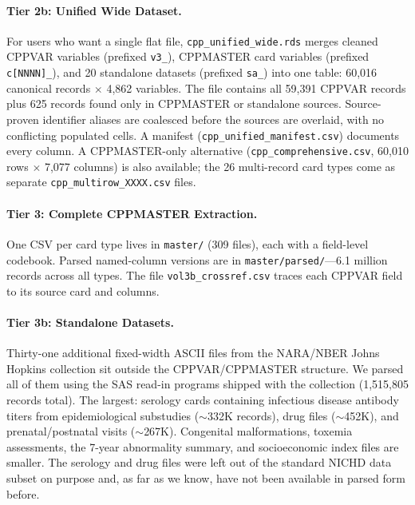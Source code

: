 \documentclass[12pt]{article}
\begin{document}
\paragraph{Tier 2b: Unified Wide Dataset.}
For users who want a single flat file, \texttt{cpp\_unified\_\allowbreak wide.rds} merges cleaned CPPVAR variables (prefixed \texttt{v3\_}), CPPMASTER card variables (prefixed \texttt{c[NNNN]\_}), and 20 standalone datasets (prefixed \texttt{sa\_}) into one table: 60,016 canonical records $\times$ 4,862 variables. The file contains all 59,391 CPPVAR records plus 625 records found only in CPPMASTER or standalone sources. Source-proven identifier aliases are coalesced before the sources are overlaid, with no conflicting populated cells. A manifest (\texttt{cpp\_unified\_manifest.csv}) documents every column. A CPPMASTER-only alternative (\texttt{cpp\_comprehensive.csv}, 60,010 rows $\times$ 7,077 columns) is also available; the 26 multi-record card types come as separate \texttt{cpp\_multirow\_XXXX.csv} files.

\paragraph{Tier 3: Complete CPPMASTER Extraction.}
One CSV per card type lives in \texttt{master/} (309 files), each with a field-level codebook. Parsed named-column versions are in \texttt{master/\allowbreak parsed/}---6.1 million records across all types. The file \texttt{vol3b\_crossref.csv} traces each CPPVAR field to its source card and columns.

\paragraph{Tier 3b: Standalone Datasets.}
Thirty-one additional fixed-width ASCII files from the NARA/NBER Johns Hopkins collection sit outside the CPPVAR/CPPMASTER structure. We parsed all of them using the SAS read-in programs shipped with the collection (1,515,805 records total). The largest: serology cards containing infectious disease antibody titers from epidemiological substudies ($\sim$332K records), drug files ($\sim$452K), and prenatal/postnatal visits ($\sim$267K). Congenital malformations, toxemia assessments, the 7-year abnormality summary, and socioeconomic index files are smaller. The serology and drug files were left out of the standard NICHD data subset on purpose and, as far as we know, have not been available in parsed form before.
\end{document}
